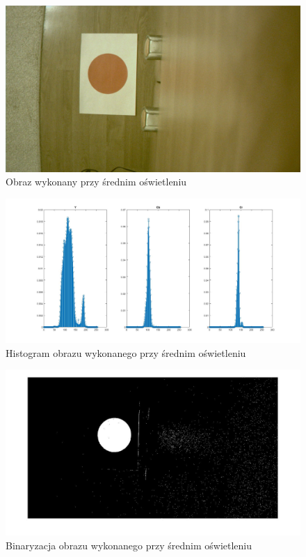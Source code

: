 \begin{figure}[h]
	\centering
	\includegraphics[width=\textwidth]{osw2.jpg}
	\caption{Obraz wykonany przy średnim oświetleniu}
	\label{fig:osw2}
\end{figure}
\begin{figure}[h]
	\centering
	\includegraphics[width=\textwidth]{hist2.jpg}
	\caption{Histogram obrazu wykonanego przy średnim oświetleniu}
	\label{fig:hist2}
\end{figure}
\begin{figure}[h]
	\centering
	\includegraphics[width=\textwidth]{bin2.jpg}
	\caption{Binaryzacja obrazu wykonanego przy średnim oświetleniu}
	\label{fig:bin2}
\end{figure}
